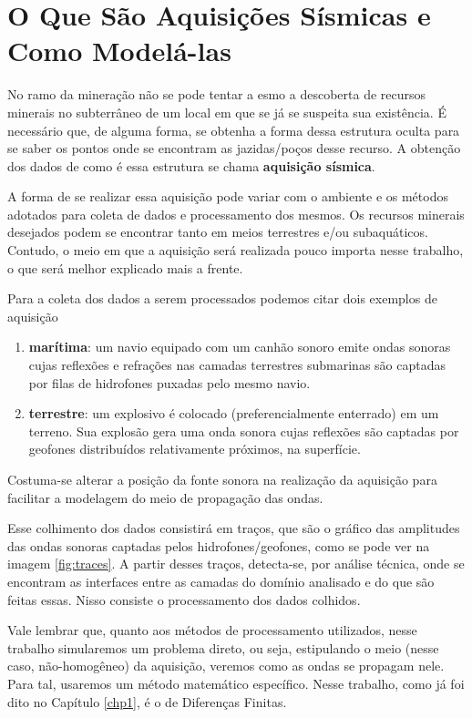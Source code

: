 \section{O Que São Aquisições Sísmicas e Como Modelá-las}

	No ramo da mineração não se pode tentar a esmo a descoberta de recursos
	minerais no subterrâneo de um local em que se já se suspeita sua existência.
	É necessário que, de alguma forma, se obtenha a forma dessa estrutura oculta
	para se saber os pontos onde se encontram as jazidas/poços desse recurso.
	A obtenção dos dados de como é essa estrutura se chama \textbf{aquisição
	sísmica}.

	A forma de se realizar essa aquisição pode variar com o ambiente e os
	métodos adotados para coleta de dados e processamento dos mesmos. Os
	recursos minerais desejados podem se encontrar tanto em meios terrestres
	e/ou subaquáticos. Contudo, o meio em que a aquisição será realizada pouco
	importa nesse trabalho, o que será melhor explicado mais a frente.

	Para a coleta dos dados a serem processados podemos citar dois exemplos
	de aquisição
	\begin{enumerate}
		\item \textbf{marítima}: um navio equipado com um canhão
		sonoro emite ondas sonoras cujas reflexões e refrações nas camadas
		terrestres submarinas são captadas por filas de hidrofones puxadas pelo
		mesmo navio.

		\item \textbf{terrestre}: um explosivo é colocado (preferencialmente
		enterrado) em um terreno. Sua explosão gera uma onda sonora cujas
		reflexões são captadas por geofones distribuídos relativamente próximos,
		na superfície.
	\end{enumerate}
	Costuma-se alterar a posição da fonte sonora na realização da aquisição para
	 facilitar a modelagem do meio de propagação das
	ondas.

	Esse colhimento dos dados consistirá em traços, que são o gráfico das amplitudes
	das ondas sonoras captadas pelos hidrofones/geofones, como se pode ver na imagem 
	\ref{fig:traces}. A partir desses traços, detecta-se, por análise técnica, onde se 
	encontram as interfaces entre as camadas do domínio analisado e do que são feitas 
	essas. Nisso consiste o processamento dos dados colhidos.

	Vale lembrar que, quanto aos métodos de processamento utilizados,  nesse trabalho simularemos um problema
	direto, ou seja, estipulando o meio (nesse caso, não-homogêneo) da aquisição,
	veremos como as ondas se propagam nele. Para tal, usaremos um método
	matemático específico. Nesse trabalho, como já foi dito no Capítulo
	\ref{chp1}, é o de Diferenças Finitas.
